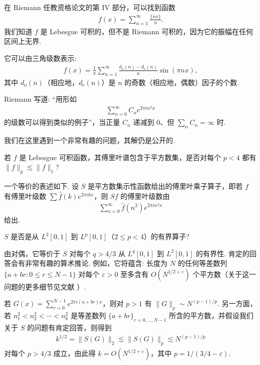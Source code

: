 在 Riemann 任教资格论文的第 IV 部分，可以找到函数
\begin{align*}
  f(x)=\sum_{n=1}^{\infty}\frac{\{nx\}}{n}.
\end{align*}
我们知道 $f$ 是 Lebesgue 可积的，但不是 Riemann 可积的，因为它的振幅在任何区间上无界.

它可以由三角级数表示:
\begin{align*}
  f(x)=\frac{1}{\pi}\sum_{n=1}^{\infty}\frac{d_{\mathrm{o}}(n)-d_{\mathrm{e}}(n)}{n}\sin(\pi n x),
\end{align*}
其中 $d_{\mathrm{o}}(n)$（相应地，$d_{\mathrm{e}}(n)$）是 $n$ 的奇数（相应地，偶数）因子的个数.

Riemann 写道: ``用形如
\begin{align*}
  \sum_{n=0}^{\infty}C_{n}e^{2\pi i n^{2}x}
\end{align*}
的级数可以得到类似的例子''，当正量 $C_n$ 递减到 $0$、但 $\sum_n C_n = \infty$ 时.

我们在这里遇到一个非常有趣的问题，其解仍是公开的.

\begin{question}\label{ques:8.1}
若 $f$ 是 Lebesgue 可积函数，其傅里叶谱包含于平方数集，是否对每个 $p < 4$ 都有 $\|f\|_p \lesssim \|f\|_1$?
\end{question}

一个等价的表述如下. 设 $S$ 是平方数集示性函数给出的傅里叶乘子算子，即若 $f$ 有傅里叶级数 $\sum \widehat{f}(k)e^{2\pi ikx}$，则 $Sf$ 的傅里叶级数由
\begin{align*}
  \sum_{n=0}^{\infty}\widehat{f}(n^{2})e^{2\pi i n^{2}x}
\end{align*}
给出.

\begin{question}\label{ques:8.2}
$S$ 是否是从 $L^2[0,1]$ 到 $L^p[0,1]$（$2 \leq p < 4$）的有界算子?
\end{question}

由对偶，它等价于 $S$ 对每个 $q > 4/3$ 从 $L^q[0,1]$ 到 $L^2[0,1]$ 的有界性. 肯定的回答会有非常有趣的算术推论. 例如，它将蕴含: 长度为 $N$ 的任何等差数列 $\{a + br : 0 \leq r \leq N - 1\}$ 对每个 $\varepsilon > 0$ 至多含有 $O(N^{1/2+\varepsilon})$ 个平方数（关于这一问题的更多细节见文献 \cite{b180}）.

若 $G(x) = \sum_{r=0}^{N-1} e^{2\pi i(a+br)x}$，则对 $p > 1$ 有 $\|G\|_p \sim N^{(p-1)/p}$. 另一方面，若 $n_1^2 < n_2^2 < \cdots < n_k^2$ 是等差数列 $\{a+br\}_{r=0,\ldots,N-1}$ 所含的平方数，并假设我们关于 $S$ 的问题有肯定回答，则得到
\begin{align*}
  k^{1/2}=\|S(G)\|_{2}\lesssim\|S(G)\|_{p}\lesssim N^{(p-1)/p}
\end{align*}
对每个 $p > 4/3$ 成立，由此得 $k = O(N^{1/2+\varepsilon})$，其中 $p = 1/(3/4 - \varepsilon)$.

